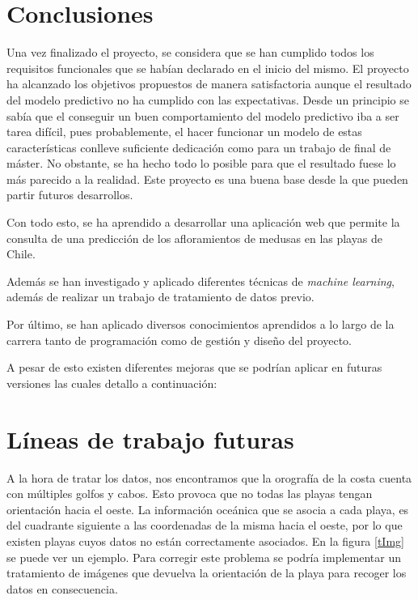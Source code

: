 
\section{Conclusiones}
Una vez finalizado el proyecto, se considera que se han cumplido todos los requisitos funcionales que se habían declarado en el inicio del mismo. El proyecto ha alcanzado los objetivos propuestos de manera satisfactoria aunque el resultado del modelo predictivo no ha cumplido con las expectativas. Desde un principio se sabía que el conseguir un buen comportamiento del modelo predictivo iba a ser tarea difícil, pues probablemente, el hacer funcionar un modelo de estas características conlleve suficiente dedicación como para un trabajo de final de máster. No obstante, se ha hecho todo lo posible para que el resultado fuese lo más parecido a la realidad. Este proyecto es una buena base desde la que pueden partir futuros desarrollos.

Con todo esto, se ha aprendido a desarrollar una aplicación web que permite la consulta de una predicción de los afloramientos de medusas en las playas de Chile.

Además se han investigado y aplicado diferentes técnicas de \emph{machine learning}, además de realizar un trabajo de tratamiento de datos previo.

Por último, se han aplicado diversos conocimientos aprendidos a lo largo de la carrera tanto de programación como de gestión y diseño del proyecto.

A pesar de esto existen diferentes mejoras que se podrían aplicar en futuras versiones las cuales detallo a continuación:
 
\section{Líneas de trabajo futuras}

A la hora de tratar los datos, nos encontramos que la orografía de la costa cuenta con múltiples golfos y cabos. Esto provoca que no todas las playas tengan orientación hacia el oeste. La información oceánica que se asocia a cada playa, es del cuadrante siguiente a las coordenadas de la misma hacia el oeste, por lo que existen playas cuyos datos no están correctamente asociados. En la figura \ref{tImg} se puede ver un ejemplo. Para corregir este problema se podría implementar un tratamiento de imágenes que devuelva la orientación de la playa para recoger los datos en consecuencia.

